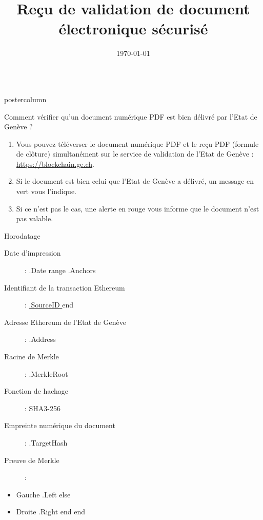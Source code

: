 \documentclass[roundedcorners=true, titleposition=center]{beamerthemeruhuisstijlposter}
\title{Reçu de validation de document électronique sécurisé}
\date{\today}
\begin{document}
\begin{frame}
\begin{columns}
\begin{column}{0.95\textwidth}
\begin{beamercolorbox}[center, wd=\textwidth]{postercolumn}
\begin{minipage}[T]{0.95\textwidth}
\parbox[t][\columnheight]{\textwidth}{%
\begin{block}{Comment vérifier qu'un document numérique PDF est bien délivré par l'Etat de Genève ?}
\begin{enumerate}
\item Vous pouvez téléverser le document numérique PDF et le reçu PDF (formule de clôture) simultanément sur le service de validation de l'Etat de Genève : \href{https://blockchain.ge.ch}{https://blockchain.ge.ch}.
\item Si le document est bien celui que l'Etat de Genève a délivré, un message en vert vous l'indique.
\item Si ce n'est pas le cas, une alerte en rouge vous informe que le document n'est pas valable.
\end{enumerate}
\end{block}
\medskip
\begin{block}{Horodatage}
\begin{description}
\item [Date d'impression] :\linebreak
{{ .Date }}
{{ range .Anchors }}
\item [Identifiant de la transaction Ethereum] :\linebreak
\href{https://etherscan.io/tx/0x{{ .SourceID }} }{ {{.SourceID }} }
{{ end }}
\item[Adresse Ethereum de l'Etat de Genève] :\linebreak
{{ .Address }}
\item[Racine de Merkle] :\linebreak
{{ .MerkleRoot }}
\item[Fonction de hachage] : \linebreak
SHA3-256
\item[Empreinte numérique du document] :\linebreak
{{ .TargetHash }}
\item[Preuve de Merkle] :
\end{description}
\begin{itemize}
{{ range .Proof }}
    {{ if .Left }}
        \item Gauche {{ .Left }}
    {{ else }}
        \item Droite {{ .Right }}
    {{ end }}
{{ end }}
\end{itemize}
\end{block}
}
\end{minipage}
\end{beamercolorbox}
\end{column}
\end{columns}
\end{frame}
\end{document}
